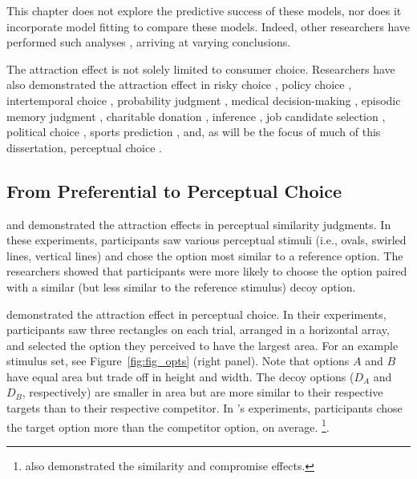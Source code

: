 This chapter does not explore the predictive success of these models, nor does it incorporate model fitting to compare these models. Indeed, other researchers have performed such analyses \parencite{turnerCompetingTheoriesMultialternative2018a,cataldoModelingPreferenceReversals2021,tsetsosPreferenceReversalMultiattribute2010a, molloyWhatResponseTime2019a,berkowitschRigorouslyTestingMultialternative2014b,hotalingTheoreticalDevelopmentsDecision2010,cohen2017multi}, arriving at varying conclusions. 

The attraction effect is not solely limited to consumer choice. Researchers have also demonstrated the attraction effect in risky choice \parencite{mohr2017attraction}, policy choice \parencite{herneDecoyAlternativesPolicy1997b}, intertemporal choice \parencite{mariniAttractionComesMany2020}, probability judgment \parencite{caiWhenAlternativeHypotheses2023}, medical decision-making \parencite{schwartz1999more}, episodic memory judgment \parencite{maylorSimilarityAttractionEffects2007b}, charitable donation \parencite{pittarello2020three},  inference \parencite{truebloodMultialternativeContextEffects2012}, job candidate selection \parencite{highhouseContextDependentSelectionEffects1996}, political choice \parencite{pan1995attractiovoting}, sports prediction \parencite{fang2024context}, and, as will be the focus of much of this dissertation, perceptual choice \parencite{evansImpactPresentationOrder2021,trueblood2013not, trueblood2015fragile, spektorRepulsionEffectPreferential2022,spektorWhenGoodLooks2018b,yearsleyContextEffectsSimilarity2022,turnerCompetingTheoriesMultialternative2018a,liaoInfluenceDistanceDecoy2021}. 


\subsection{From Preferential to Perceptual Choice}

\textcite{choplinComparisoninducedDecoyEffects2005b} and \textcite{yearsleyContextEffectsSimilarity2022} demonstrated the attraction effects in perceptual similarity judgments. In these experiments, participants saw various perceptual stimuli (i.e., ovals, swirled lines, vertical lines) and chose the option most similar to a reference option. The researchers showed that participants were more likely to choose the option paired with a similar (but less similar to the reference stimulus) decoy option.

\textcite{trueblood2013not} demonstrated the attraction effect in perceptual choice. In their experiments, participants saw three rectangles on each trial, arranged in a horizontal array, and selected the option they perceived to have the largest area. For an example stimulus set, see Figure~\ref{fig:fig_opts} (right panel). Note that options $A$ and $B$ have equal area but trade off in height and width. The decoy options ($D_{A}$ and $D_{B}$, respectively) are smaller in area but are more similar to their respective targets than to their respective competitor. In \textcite{trueblood2013not}'s experiments, participants chose the target option more than the competitor option, on average. \footnote{\textcite{trueblood2013not} also demonstrated the similarity and compromise effects.}. 


